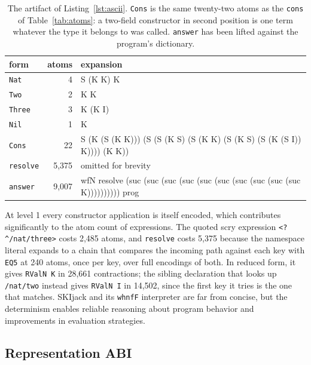 \documentclass[english,submission,code=tt]{programming}
\begin{document}
\begin{table}[htb]
\caption{The artifact of Listing~\ref{lst:ascii}.  \texttt{Cons} is the
same twenty-two atoms as the \texttt{cons} of Table~\ref{tab:atoms}: a
two-field constructor in second position is one term whatever the type
it belongs to was called. \texttt{answer} has been lifted against the
program's dictionary.}\label{tab:lookup}
\centering\footnotesize
\begin{tabular}{@{}l r >{\raggedright\arraybackslash\ttfamily}p{3.9in}@{}}
\toprule
\textrm{form} & \textrm{atoms} & \textrm{expansion} \\
\midrule
\texttt{Nat}     &     4 & S (K K) K \\
\texttt{Two}     &     2 & K K \\
\texttt{Three}   &     3 & K (K I) \\
\texttt{Nil}     &     1 & K \\
\texttt{Cons}    &    22 & S (K (S (K K))) (S (S (K S) (S (K K) (S (K S) (S (K (S I)) K)))) (K K)) \\
\midrule
\texttt{resolve} & 5{,}375 & \textrm{omitted for brevity} \\
\texttt{answer}  & 9{,}007 & wfN resolve (suc (suc (suc (suc (suc (suc (suc (suc (suc (suc K)))))))))) prog \\
\bottomrule
\end{tabular}
\end{table}

At level 1 every constructor application is itself encoded, which contributes significantly to the atom count of expressions.
The quoted scry expression \texttt{<?\^{}/nat/three>} costs 2{,}485 
atoms, and \texttt{resolve} 
costs 5{,}375 because the namespace literal expands to a chain that 
compares the incoming path against each key with \texttt{EQ5} at 240 
atoms, once per key, over full encodings of both.  In reduced form, it 
gives \texttt{RValN K} in 28{,}661 contractions; the sibling declaration 
that looks up \texttt{/nat/two} instead gives \texttt{RValN I} in
14{,}502, since the first key it tries is the one that matches.
SKIjack and its \texttt{whnfF} interpreter are far from
concise, but the determinism enables reliable reasoning about program behavior and improvements in evaluation strategies.

\subsection{Representation ABI}\label{sec:representation-abi}
\end{document}
